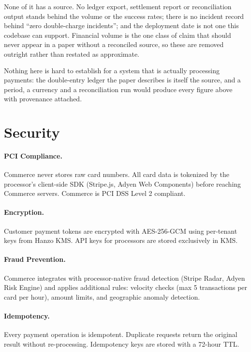 \documentclass[11pt,twocolumn]{article}
\begin{document}
None of it has a source. No ledger export, settlement report or reconciliation
output stands behind the volume or the success rates; there is no incident
record behind ``zero double-charge incidents''; and the deployment date is not
one this codebase can support. Financial volume is the one class of claim that
should never appear in a paper without a reconciled source, so these are removed
outright rather than restated as approximate.

Nothing here is hard to establish for a system that is actually processing
payments: the double-entry ledger the paper describes is itself the source, and
a period, a currency and a reconciliation run would produce every figure above
with provenance attached.

\section{Security}

\paragraph{PCI Compliance.} Commerce never stores raw card numbers. All card data is tokenized by the processor's client-side SDK (Stripe.js, Adyen Web Components) before reaching Commerce servers. Commerce is PCI DSS Level 2 compliant.

\paragraph{Encryption.} Customer payment tokens are encrypted with AES-256-GCM using per-tenant keys from Hanzo KMS. API keys for processors are stored exclusively in KMS.

\paragraph{Fraud Prevention.} Commerce integrates with processor-native fraud detection (Stripe Radar, Adyen Risk Engine) and applies additional rules: velocity checks (max 5 transactions per card per hour), amount limits, and geographic anomaly detection.

\paragraph{Idempotency.} Every payment operation is idempotent. Duplicate requests return the original result without re-processing. Idempotency keys are stored with a 72-hour TTL.
\end{document}
